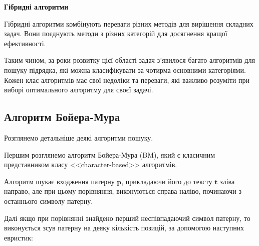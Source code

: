 \documentclass[a4paper,14pt]{extarticle} %
\begin{document}
\textbf{Гібридні алгоритми}

Гібридні алгоритми комбінують переваги різних методів для вирішення складних задач. Вони поєднують методи з різних категорій для досягнення кращої ефективності.

Таким чином, за роки розвитку цієї області задач з'явилося багато алгоритмів для пошуку підрядка, які можна класифікувати за чотирма основними категоріями. Кожен клас алгоритмів має свої недоліки та переваги, які важливо розуміти при виборі оптимального алгоритму для своєї задачі.

\subsection{Алгоритм Бойера-Мура}
Розглянемо детальніше деякі алгоритми пошуку.

Першим розглянемо алгоритм Бойера-Мура (BM), який є класичним представником класу <<character-based>> алгоритмів.

Алгоритм шукає входження патерну $\textbf{p}$, прикладаючи його до тексту $\textbf{t}$ зліва направо, але при цьому порівняння, виконуються справа наліво, починаючи з останнього символу патерну.

Далі якщо при порівнянні знайдено перший неспівпадаючий символ патерну, то виконується зсув патерну на деяку кількість позицій, за допомогою наступних евристик:
\end{document}
